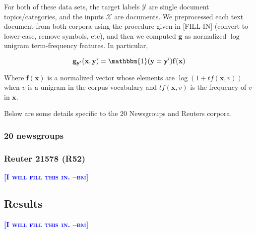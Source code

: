 \documentclass{article} %
\newcommand{\bmcomment}[1]{\textcolor{blue}{\textsc{\textbf{[#1 --bm]}}}}
\begin{document}
For both of these data sets, the target labels $\mathcal{Y}$ are 
single document topics/categories, and the inputs $\mathcal{X}$ are
documents.  We preprocessed each text document from both corpora 
using the procedure given in [FILL IN] (convert to lower-case, 
remove symbols, etc), and then we computed $\mathbf{g}$ as normalized
$\log$ unigram term-frequency features.  In particular,

\begin{equation}
\mathbf{g}_{\mathbf{y'}}(\mathbf{x},\mathbf{y}) = \mathbbm{1}(\mathbf{y}=\mathbf{y'})\mathbf{f}(\mathbf{x})
\end{equation}

Where $\mathbf{f}(\mathbf{x})$ is a normalized vector whose elements 
are $\log(1+tf(\mathbf{x},v))$ when $v$ is a unigram in the corpus 
vocabulary and $tf(\mathbf{x},v)$ is the frequency of $v$ in $\mathbf{x}$.

Below are some details specific to the 20 Newsgroups and Reuters 
corpora.

\subsubsection{20 newsgroups}



\subsubsection{Reuter 21578 (R52)}

\bmcomment{I will fill this in.}

\subsection{Results}

\bmcomment{I will fill this in.}


\end{document}
